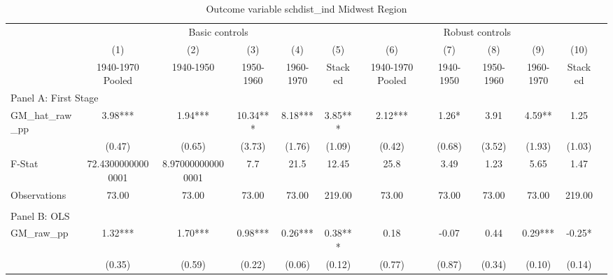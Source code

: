  \begin{table}[htbp]\centering {} \begin{threeparttable} \caption{Outcome variable schdist\_ind Midwest Region} \begin{tabular}{l*{11}{c}} \toprule
          &\multicolumn{5}{c}{Basic controls}                                   &\multicolumn{5}{c}{Robust controls}                                  \\\cmidrule(lr){2-6}\cmidrule(lr){7-11}
          &\multicolumn{1}{c}{(1)}&\multicolumn{1}{c}{(2)}&\multicolumn{1}{c}{(3)}&\multicolumn{1}{c}{(4)}&\multicolumn{1}{c}{(5)}&\multicolumn{1}{c}{(6)}&\multicolumn{1}{c}{(7)}&\multicolumn{1}{c}{(8)}&\multicolumn{1}{c}{(9)}&\multicolumn{1}{c}{(10)}\\
          &\multicolumn{1}{c}{1940-1970 Pooled}&\multicolumn{1}{c}{1940-1950}&\multicolumn{1}{c}{1950-1960}&\multicolumn{1}{c}{1960-1970}&\multicolumn{1}{c}{Stacked}&\multicolumn{1}{c}{1940-1970 Pooled}&\multicolumn{1}{c}{1940-1950}&\multicolumn{1}{c}{1950-1960}&\multicolumn{1}{c}{1960-1970}&\multicolumn{1}{c}{Stacked}\\
\cmidrule(lr){1-11}
\multicolumn{10}{l}{Panel A: First Stage}\\
\cmidrule(lr){1-11}
GM\_hat\_raw\_pp&      3.98***&      1.94***&     10.34***&      8.18***&      3.85***&      2.12***&      1.26*  &      3.91   &      4.59** &      1.25   \\
          &    (0.47)   &    (0.65)   &    (3.73)   &    (1.76)   &    (1.09)   &    (0.42)   &    (0.68)   &    (3.52)   &    (1.93)   &    (1.03)   \\
\midrule
F-Stat    &72.43000000000001   &8.970000000000001   &       7.7   &      21.5   &     12.45   &      25.8   &      3.49   &      1.23   &      5.65   &      1.47   \\
Observations&     73.00   &     73.00   &     73.00   &     73.00   &    219.00   &     73.00   &     73.00   &     73.00   &     73.00   &    219.00   \\
\cmidrule[\heavyrulewidth](lr){1-11} \\ \cmidrule[\heavyrulewidth](lr){1-11}
\multicolumn{10}{l}{Panel B: OLS}\\
\cmidrule(lr){1-11}
GM\_raw\_pp &      1.32***&      1.70***&      0.98***&      0.26***&      0.38***&      0.18   &     -0.07   &      0.44   &      0.29***&     -0.25*  \\
          &    (0.35)   &    (0.59)   &    (0.22)   &    (0.06)   &    (0.12)   &    (0.77)   &    (0.87)   &    (0.34)   &    (0.10)   &    (0.14)   \\

\end{tabular}
\end{threeparttable}
\end{table}
